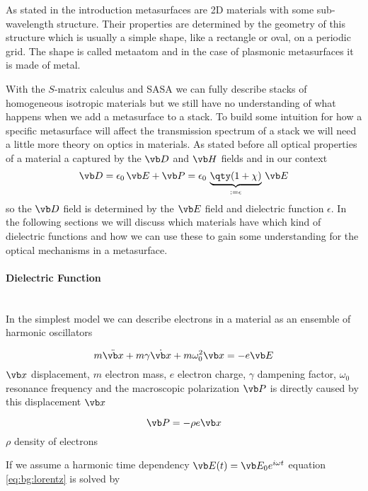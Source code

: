 As stated in the introduction metasurfaces are 2D materials with some sub-wavelength structure. Their properties are determined by the geometry of this structure which is usually a simple shape, like a rectangle or oval, on a periodic grid. The shape is called metaatom and in the case of plasmonic metasurfaces it is made of metal.

\indent
With the $S$-matrix calculus and SASA we can fully describe stacks of homogeneous isotropic materials but we still have no understanding of what happens when we add a metasurface to a stack. To build some intuition for how a specific metasurface will affect the transmission spectrum of a stack we will need a little more theory on optics in materials. As stated before all optical properties of a material a captured by the $\vb D$ and $\vb H$ fields and in our context
\begin{equation}
    \vb D = 
    \epsilon_0 \, \vb E + \vb P =
    \epsilon_0\, \underbrace{\qty(1 + \chi)}_{
         := \epsilon
    }\, \vb E
\end{equation}
so the $\vb D$ field is determined by the $\vb E$ field and dielectric function $\epsilon$. In the following sections we will discuss which materials have which kind of dielectric functions and how we can use these to gain some understanding for the optical mechanisms in a metasurface.

\paragraph{Dielectric Function}~\\
In the simplest model we can describe electrons in a material as an ensemble of harmonic oscillators

\begin{equation} \label{eq:bg:lorentz}
    m \ddot{\vb x} + m \gamma \dot{\vb x} + m \omega_0^2 \vb x = -e \vb E
\end{equation}
\indent
$\vb x$ displacement, $m$ electron mass, $e$ electron charge, $\gamma$ dampening factor, $\omega_0$ resonance frequency 
and the macroscopic polarization $\vb P$ is directly caused by this displacement $\vb x$

\begin{equation}
    \vb P = - \rho e \vb x
\end{equation}
\indent
$\rho$ density of electrons

If we assume a harmonic time dependency $\vb E(t) = \vb E_0 e^{i \omega t}$ equation \eqref{eq:bg:lorentz} is solved by 

